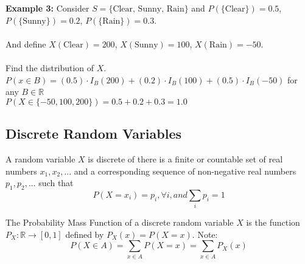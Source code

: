 \documentclass[12pt, twoside]{article}
\begin{document}
\textbf{Example 3:} Consider $S = \{ \text{Clear, Sunny, Rain} \}$ and $P(\{ \text{Clear} \}) = 0.5$, $P(\{ \text{Sunny} \}) = 0.2$, $P(\{ \text{Rain} \}) = 0.3$.\\
\\
And define $X(\text{Clear}) = 200$, $X(\text{Sunny}) = 100$, $X(\text{Rain}) = -50$.\\
\\
Find the distribution of $X$.\\
$P(x \in B) = (0.5) \cdot I_B (200) + (0.2) \cdot I_B (100) + (0.5) \cdot I_B (-50)$ for any $B \in \mathbb{R}$\\
$P(X \in \{ -50, 100, 200 \}) = 0.5 + 0.2 + 0.3 = 1.0$

\subsection{Discrete Random Variables}

\begin{tcolorbox}[title=Definition: Discrete Random Variables]
	A random variable $X$ is discrete of there is a finite or countable set of real numbers $x_1, x_2, ...$ and a corresponding sequence of non-negative real numbers $p_1, p_2, ...$ such that
	$$P(X = x_i) = p_i, \forall i, and \sum_{i} p_i = 1$$
\end{tcolorbox}

\begin{tcolorbox}[title=Probability Mass Function]
	The Probability Mass Function of a discrete random variable $X$ is the function $P_X : \mathbb{R} \rightarrow [ 0,1 ]$ defined by $P_X (x) = P(X = x)$. Note: $$P(X \in A) = \sum_{x \in A} P(X = x) = \sum_{x \in A} P_X (x)$$
\end{tcolorbox}
\end{document}
